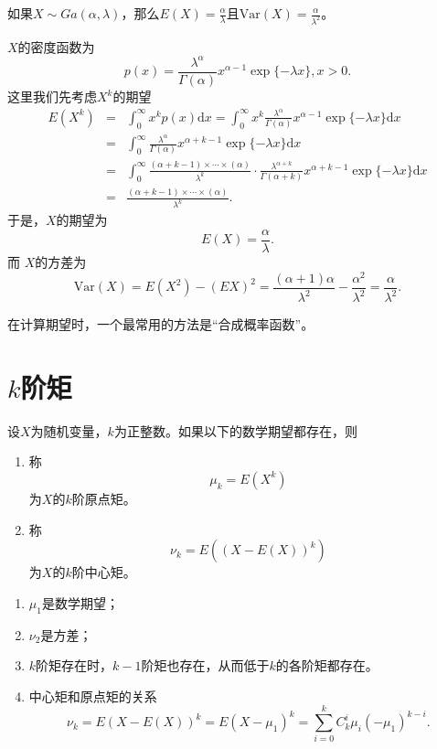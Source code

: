 \begin{example}
    如果$X\sim Ga(\alpha,\lambda)$，那么$E(X) = \frac{\alpha}{\lambda}$且$\text{Var}(X) = \frac{\alpha}{\lambda^2}$。
\end{example}
\begin{solution}
$X$的密度函数为
    $$
    p(x) = \frac{\lambda^\alpha}{\Gamma(\alpha)} x^{\alpha-1} \exp\{-\lambda x\},x>0.
    $$
这里我们先考虑$X^k$的期望
\begin{eqnarray*}
    E(X^k) &=&  \int_{0}^{\infty} x^k p(x) \text{d}x = \int_{0}^{\infty} x^k \frac{\lambda^\alpha}{\Gamma(\alpha)} x^{\alpha-1} \exp\{-\lambda x\}\text{d}x\\
    &=& \int_{0}^{\infty}  \frac{\lambda^\alpha}{\Gamma(\alpha)} x^{\alpha+k -1} \exp\{-\lambda x\}\text{d}x\\
    &=& \int_{0}^{\infty} \frac{(\alpha+k-1)\times \cdots \times (\alpha)}{\lambda^k}\cdot \frac{\lambda^{\alpha+k}}{\Gamma(\alpha+k)} x^{\alpha+k -1} \exp\{-\lambda x\}\text{d}x\\
    &=&\frac{(\alpha+k-1)\times \cdots \times (\alpha)}{\lambda^k}.
\end{eqnarray*}
于是，$X$的期望为
$$E(X) = \frac{\alpha}{\lambda}.$$
而
$X$的方差为
$$
\text{Var}(X) = E(X^2) - (E X)^2 = \frac{(\alpha+1)\alpha}{\lambda^2} -  \frac{\alpha^2}{\lambda^2}  =  \frac{\alpha}{\lambda^2}.
$$
\end{solution}

\begin{remark}
    在计算期望时，一个最常用的方法是“合成概率函数”。
\end{remark}

\section{$k$阶矩}

\begin{definition}\label{def:moment}
设$X$为随机变量，$k$为正整数。如果以下的数学期望都存在，则
\begin{enumerate}
    \item 称
$$
\mu_k = E(X^k)
$$
为$X$的$k$阶原点矩。
\item 称
$$
\nu_k = E((X-E(X))^k)
$$
为$X$的$k$阶中心矩。
\end{enumerate}
\end{definition}

\begin{remark}
    \begin{enumerate}
        \item $\mu_1$是数学期望；
        \item $\nu_2$是方差；
        \item $k$阶矩存在时，$k-1$阶矩也存在，从而低于$k$的各阶矩都存在。
        \item 中心矩和原点矩的关系
        $$
        \nu_k = E(X-E(X))^k = E(X-\mu_1)^k = \sum_{i=0}^k C_k^i \mu_i (-\mu_1)^{k-i}.
        $$
    \end{enumerate}
\end{remark} 

